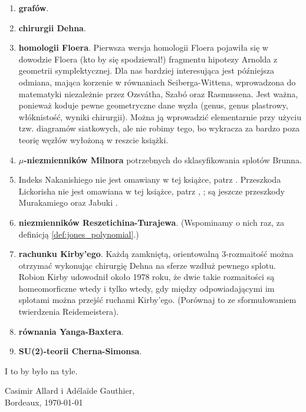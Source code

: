 \begin{enumerate}
    \item \textbf{grafów}. \cite[s. 18]{burde2014}
    \item \textbf{chirurgii Dehna}. \cite[s. 42]{burde2014}
    \item \textbf{homologii Floera}.
    Pierwsza wersja homologii Floera pojawiła się w dowodzie Floera (kto by się spodziewał!) fragmentu hipotezy Arnolda z geometrii symplektycznej.
    Dla nas bardziej interesująca jest późniejsza odmiana, mająca korzenie w równaniach Seiberga-Wittena, wprowadzona do matematyki niezależnie przez Ozsvátha, Szabó oraz Rasmussena.
    Jest ważna, ponieważ koduje pewne geometryczne dane węzła (genus, genus plastrowy, włóknistość, wyniki chirurgii).
    Można ją wprowadzić elementarnie przy użyciu tzw. diagramów siatkowych, ale nie robimy tego, bo wykracza za bardzo poza teorię węzłów wyłożoną w reszcie książki.
    \item \textbf{$\mu$-niezmienników Milnora} potrzebnych do sklasyfikowania splotów Brunna.
    \item Indeks Nakanishiego nie jest omawiany w tej książce, patrz \cite{nakanishi1981}.
    Przeszkoda Lickorisha nie jest omawiana w tej książce, patrz \cite{cochran1986}, \cite{lickorish1985}; są jeszcze przeszkody Murakamiego \cite{murakami1990} oraz Jabuki \cite{jabuka2010}.
    \item \textbf{niezmienników Reszetichina-Turajewa}.
    (Wspominamy o nich raz, za definicją \ref{def:jones_polynomial}.)
    \item \textbf{rachunku Kirby'ego}.
    Każdą zamkniętą, orientowalną 3-rozmaitość można otrzymać wykonując chirurgię Dehna na sferze wzdłuż pewnego splotu. Robion Kirby udowodnił około 1978 roku, że dwie takie rozmaitości są homeomorficzne wtedy i tylko wtedy, gdy między odpowiadającymi im splotami można przejść ruchami Kirby'ego.
    (Porównaj to ze sformułowaniem twierdzenia Reidemeistera).
    \item \textbf{równania Yanga-Baxtera}. 
    \item \textbf{SU(2)-teorii Cherna-Simonsa}.
\end{enumerate}
I to by było na tyle.
\begin{flushright}
    Casimir Allard i Adélaïde Gauthier,\\Bordeaux, \today
\end{flushright}

